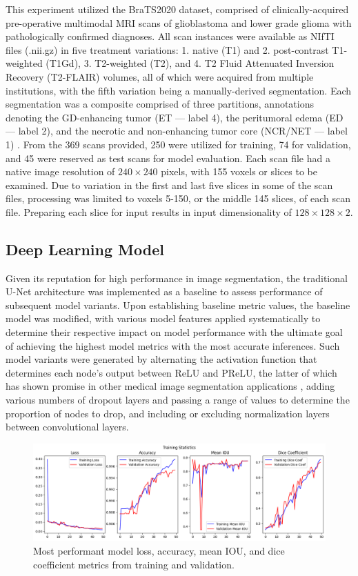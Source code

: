 \documentclass{article}
\begin{document}
\begin{multicols}{2}
This experiment utilized the BraTS2020 dataset, comprised of clinically-acquired pre-operative multimodal MRI scans of glioblastoma and lower grade glioma with pathologically confirmed diagnoses. All scan instances were available as NIfTI files (.nii.gz) in five treatment variations: 1. native (T1) and 2. post-contrast T1-weighted (T1Gd), 3. T2-weighted (T2), and 4. T2 Fluid Attenuated Inversion Recovery (T2-FLAIR) volumes, all of which were acquired from multiple institutions, with the fifth variation being a manually-derived segmentation. Each segmentation was a composite comprised of three partitions, annotations denoting the GD-enhancing tumor (ET — label 4), the peritumoral edema (ED — label 2), and the necrotic and non-enhancing tumor core (NCR/NET — label 1) \cite{bratsPaper}. From the 369 scans provided, 250 were utilized for training, 74 for validation, and 45 were reserved as test scans for model evaluation. Each scan file had a native image resolution of $240\times240$ pixels, with 155 voxels or slices to be examined. Due to variation in the first and last five slices in some of the scan files, processing was limited to voxels 5-150, or the middle 145 slices, of each scan file. Preparing each slice for input results in input dimensionality of $128\times128\times2$.

\subsection{Deep Learning Model}

Given its reputation for high performance in image segmentation, the traditional U-Net architecture was implemented as a baseline to assess performance of subsequent model variants. Upon establishing baseline metric values, the baseline model was modified, with various model features applied systematically to determine their respective impact on model performance with the ultimate goal of achieving the highest model metrics with the most accurate inferences. Such model variants were generated by alternating the activation function that determines each node’s output between ReLU and PReLU, the latter of which has shown promise in other medical image segmentation applications \cite{prelu_2020}, adding various numbers of dropout layers and passing a range of values to determine the proportion of nodes to drop, and including or excluding normalization layers between convolutional layers.

\begin{figure}
\centering
\includegraphics[width=1\linewidth]{paper_resources/training statistics.png}
\caption{\label{fig:train_stats}Most performant model loss, accuracy, mean IOU, and dice coefficient metrics from training and validation.}
\end{figure}


\end{multicols}
\end{document}
